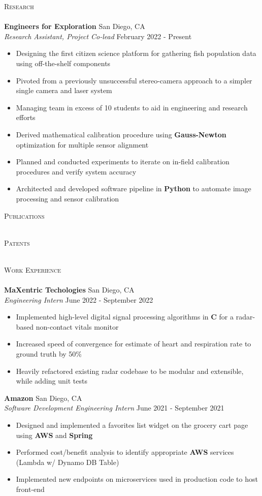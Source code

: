 \documentclass[a4paper]{article}
\newcommand{\lineunder} {
    \vspace*{-8pt} \\
    \hspace*{-18pt} \hrulefill \\
}
\newcommand{\header} [1] {
    {\hspace*{-18pt}\vspace*{6pt} \textsc{#1}}
    \vspace*{-6pt} \lineunder
}
\newenvironment{entry}[4][]{
  \textbf{#2} \hfill #1 \\
  \textit{#3} \hfill #4 \\
  \vspace{-2mm}
  \begin{itemize} \itemsep 0em
  }
  {
  \end{itemize}
}
\begin{document}
\header{Research}
\vspace{1mm}
\begin{entry}[San Diego, CA]{Engineers for Exploration}{Research
    Assistant, Project Co-lead}{February 2022 - Present}
	\item Designing the first citizen science platform for gathering fish population data
    using off-the-shelf components
    \item Pivoted from a previously unsuccessful stereo-camera approach to a simpler single camera and laser system
    \item Managing team in excess of 10 students to aid in engineering and research efforts
  \item Derived mathematical calibration procedure using \textbf{Gauss-Newton} optimization
    for multiple sensor alignment
  \item Planned and conducted experiments to iterate on in-field calibration procedures and verify system accuracy
	\item Architected and developed software pipeline in \textbf{Python} to automate image
    processing and sensor calibration
\end{entry}

\header{Publications}
\nocite{thesis,paper}



\header{Patents}

\header{Work Experience}
\vspace{1mm}
\begin{entry}[San Diego, CA]{MaXentric Techologies}{Engineering Intern}{June
    2022 - September 2022}
	\item Implemented high-level digital signal processing algorithms in \textbf{C} for a radar-based non-contact vitals monitor
  \item Increased speed of convergence for estimate of heart and respiration
    rate to ground truth by 50\%
	\item Heavily refactored existing radar codebase to be modular and
    extensible, while adding unit tests
\end{entry}

  \begin{entry}[San Diego, CA]{Amazon}{Software Development Engineering
      Intern}{June 2021 - September 2021}
  \item Designed and implemented a favorites list widget on the grocery cart page using \textbf{AWS} and \textbf{Spring}
	\item Performed cost/benefit analysis to identify appropriate \textbf{AWS} services (Lambda w/ Dynamo DB Table)
	\item Implemented new endpoints on microservices used in production code to host front-end
\end{entry}
\end{document}

